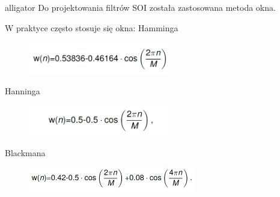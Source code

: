 \documentclass[12pt]{article}
\begin{document}
\begin{labeling}{alligator}
Do projektowania filtrów SOI została zastosowana metoda okna.


W praktyce często stosuje się okna:
\subitem Hamminga
\newpage
\begin{figure}[h!]
 \centering
 \includegraphics[width=6.3cm]{Hm.PNG}
 \vspace{-0.3cm}
 \label{gw}
\end{figure}

\subitem Hanninga

\begin{figure}[h!]
 \centering
 \includegraphics[width=6.3cm]{Hn.PNG}
 \vspace{-0.3cm}
 \label{gw}
\end{figure}

\subitem Blackmana

\begin{figure}[h!]
 \centering
 \includegraphics[width=7.3cm]{B.PNG}
 \vspace{-0.3cm}
 \label{gw}
\end{figure}



\end{labeling}
\end{document}
